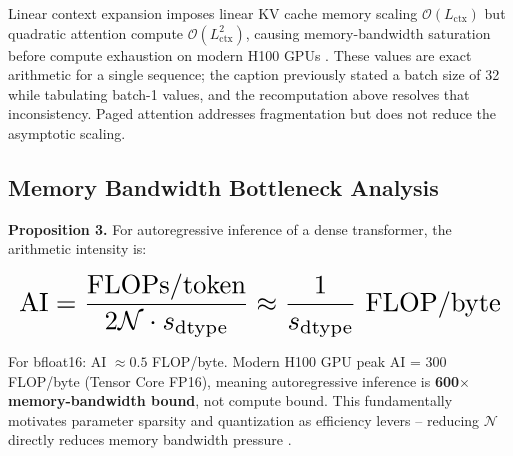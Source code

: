 \documentclass[11pt,a4paper]{article}
\begin{document}
Linear context expansion imposes linear KV cache memory scaling $\mathcal{O}(L_{\text{ctx}})$ but quadratic attention compute $\mathcal{O}(L_{\text{ctx}}^2)$, causing memory-bandwidth saturation before compute exhaustion on modern H100 GPUs \cite{arxiv_2501_02497,arxiv_2502_18080}. These values are exact arithmetic for a single sequence; the caption previously stated a batch size of 32 while tabulating batch-1 values, and the recomputation above resolves that inconsistency. Paged attention addresses fragmentation but does not reduce the asymptotic scaling.


\subsection{Memory Bandwidth Bottleneck Analysis}


\textbf{Proposition 3.} For autoregressive inference of a dense transformer, the arithmetic intensity is:



























\begin{equation}
\resizebox{\columnwidth}{!}{$\displaystyle
\begin{aligned}
\text{AI} = \frac{\text{FLOPs/token}}{2\mathcal{N} \cdot s_{\text{dtype}}} \approx \frac{1}{s_{\text{dtype}}} \text{ FLOP/byte}
\end{aligned}
$}
\end{equation}



























For bfloat16: AI $\approx 0.5$ FLOP/byte. Modern H100 GPU peak AI = 300 FLOP/byte (Tensor Core FP16), meaning autoregressive inference is \textbf{600$\times$ memory-bandwidth bound}, not compute bound. This fundamentally motivates parameter sparsity and quantization as efficiency levers -- reducing $\mathcal{N}$ directly reduces memory bandwidth pressure \cite{arxiv_2406_00584}.
\end{document}
